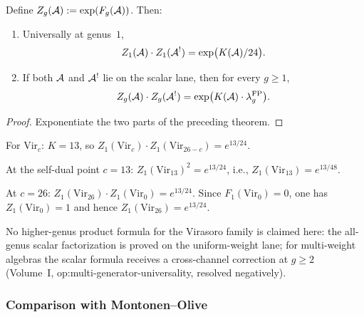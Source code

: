\begin{proposition}
\label{prop:thqg-IV-partition-duality}
Define $Z_g(\mathcal{A}) := \exp(F_g(\mathcal{A}))$. Then:
\begin{enumerate}[label=\textup{(\alph*)}]
\item Universally at genus~$1$,
\begin{equation}%
Z_1(\cA) \cdot Z_1(\cA^!)
= \exp\bigl(K(\cA)/24\bigr).
\end{equation}
\item If both $\mathcal{A}$ and $\mathcal{A}^!$ lie on the scalar lane,
then for every $g \geq 1$,
\begin{equation}%
Z_g(\cA) \cdot Z_g(\cA^!)
= \exp\bigl(K(\cA) \cdot \lambda_g^{\mathrm{FP}}\bigr).
\end{equation}
\end{enumerate}
\end{proposition}

\begin{proof}
Exponentiate the two parts of the preceding theorem.
\end{proof}

\begin{computation}
For $\mathrm{Vir}_c$: $K = 13$, so
$Z_1(\mathrm{Vir}_c) \cdot Z_1(\mathrm{Vir}_{26-c})
= e^{13/24}$.

At the self-dual point $c = 13$:
$Z_1(\mathrm{Vir}_{13})^2 = e^{13/24}$,
i.e., $Z_1(\mathrm{Vir}_{13}) = e^{13/48}$.

At $c = 26$:
$Z_1(\mathrm{Vir}_{26}) \cdot Z_1(\mathrm{Vir}_0) = e^{13/24}$.
Since $F_1(\mathrm{Vir}_0) = 0$, one has
$Z_1(\mathrm{Vir}_0) = 1$ and hence
$Z_1(\mathrm{Vir}_{26}) = e^{13/24}$.

No higher-genus product formula for the Virasoro family is claimed
here: the all-genus scalar factorization is proved on the
uniform-weight lane; for multi-weight algebras the scalar formula
receives a cross-channel correction at $g \geq 2$
\textup{(}Volume~I, op:multi-generator-universality, resolved negatively\textup{)}.
\end{computation}

\subsubsection{Comparison with Montonen--Olive}


